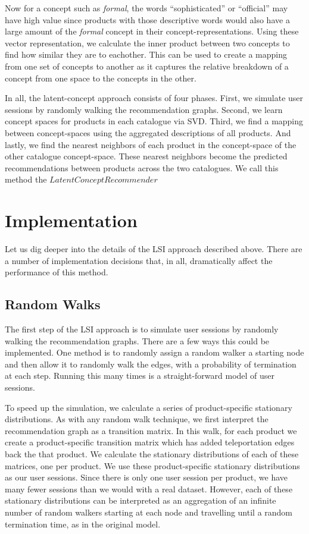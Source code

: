 \documentclass[11pt]{article}
\begin{document}
Now for a concept such as {\em formal}, the words ``sophisticated'' or
``official'' may have high value since products with those descriptive words
would also have a large amount of the {\em formal} concept in their
concept-representations. Using these vector representation, we calculate the
inner product between two concepts to find how similar they are to eachother.
This can be used to create a mapping from one set of concepts to another as it
captures the relative breakdown of a concept from one space to the concepts in
the other.

In all, the latent-concept approach consists of four phases. First, we simulate
user sessions by randomly walking the recommendation graphs. Second, we learn
concept spaces for products in each catalogue via SVD. Third, we find a mapping
between concept-spaces using the aggregated descriptions of all products. And
lastly, we find the nearest neighbors of each product in the concept-space of
the other catalogue concept-space. These nearest neighbors become the predicted
recommendations between products across the two catalogues. We call this method
the $LatentConceptRecommender$

\section*{Implementation}
Let us dig deeper into the details of the LSI approach described above. There 
are a number of implementation decisions that, in all, dramatically affect the
performance of this method.

\subsection*{Random Walks}
The first step of the LSI approach is to simulate user sessions by randomly
walking the recommendation graphs. There are a few ways this could be implemented.
One method is to randomly assign a random walker a starting node and then allow
it to randomly walk the edges, with a probability of termination at each step.
Running this many times is a straight-forward model of user sessions.

To speed up the simulation, we calculate a series of product-specific stationary
distributions. As with any random walk technique, we first interpret the 
recommendation graph as a transition matrix. In this walk, for each product we create a
product-specific transition matrix which has added teleportation edges back the
that product. We calculate the stationary distributions of each of these
matrices, one per product. We use these product-specific stationary
distributions as our user sessions. Since there is only one user session per 
product, we have many fewer sessions than we would with a real dataset. However,
each of these stationary distributions can be interpreted as an aggregation of
an infinite number of random walkers starting at each node and travelling until
a random termination time, as in the original model.
\end{document}
